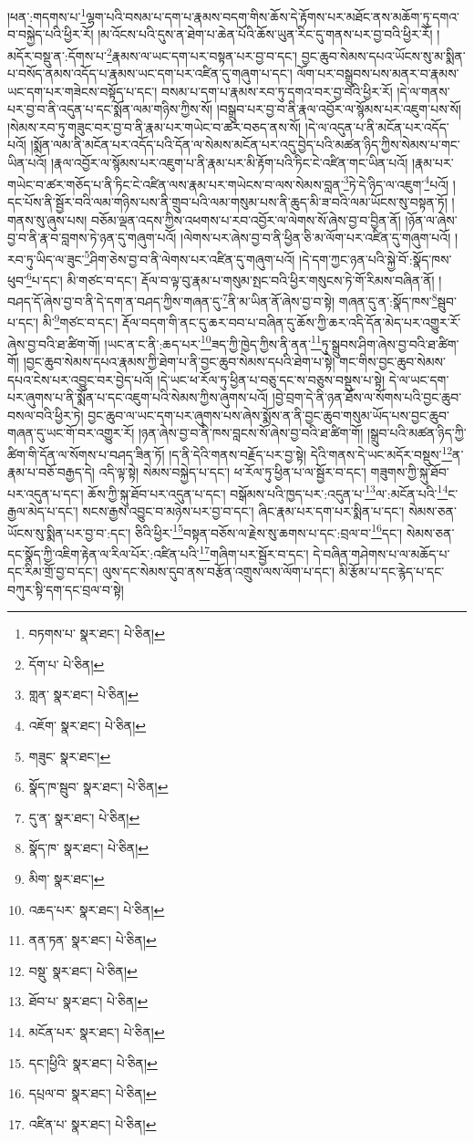 །ཕན་:གདགས་པ་\footnote{བཏགས་པ་  སྣར་ཐང་།  པེ་ཅིན། }ལྷག་པའི་བསམ་པ་དག་པ་རྣམས་བདག་གིས་ཆོས་དེ་རྟོགས་པར་མཐོང་ནས་མཆོག་ཏུ་དགའ་བ་བསྐྱེད་པའི་ཕྱིར་རོ། །མ་འོངས་པའི་དུས་ན་ཐེག་པ་ཆེན་པོའི་ཆོས་ཡུན་རིང་དུ་གནས་པར་བྱ་བའི་ཕྱིར་རོ། །
མདོར་བསྡུ་ན་:དོགས་པ་\footnote{དོག་པ་  པེ་ཅིན། }རྣམས་ལ་ཡང་དག་པར་བསྟན་པར་བྱ་བ་དང་། བྱང་ཆུབ་སེམས་དཔའ་ཡོངས་སུ་མ་སྨིན་པ་བསོད་ནམས་འདོད་པ་རྣམས་ཡང་དག་པར་འཛིན་དུ་གཞུག་པ་དང་། ལོག་པར་བསྒྲུབས་པས་མནར་བ་རྣམས་ཡང་དག་པར་གཟེངས་བསྟོད་པ་དང་། བསམ་པ་དག་པ་རྣམས་རབ་ཏུ་དགའ་བར་བྱ་བའི་ཕྱིར་རོ། །དེ་ལ་གནས་པར་བྱ་བ་ནི་འདུན་པ་དང་སྨོན་ལམ་གཉིས་ཀྱིས་སོ། །བསྒྲུབ་པར་བྱ་བ་ནི་རྣལ་འབྱོར་ལ་སྙོམས་པར་འཇུག་པས་སོ། །སེམས་རབ་ཏུ་གཟུང་བར་བྱ་བ་ནི་རྣམ་པར་གཡེང་བ་ཚར་བཅད་ནས་སོ། །དེ་ལ་འདུན་པ་ནི་མངོན་པར་འདོད་པའོ། །སྨོན་ལམ་ནི་མངོན་པར་འདོད་པའི་དོན་ལ་སེམས་མངོན་པར་འདུ་བྱེད་པའི་མཚན་ཉིད་ཀྱིས་སེམས་པ་གང་ཡིན་པའོ། །རྣལ་འབྱོར་ལ་སྙོམས་པར་འཇུག་པ་ནི་རྣམ་པར་མི་རྟོག་པའི་ཏིང་ངེ་འཛིན་གང་ཡིན་པའོ། །རྣམ་པར་གཡེང་བ་ཚར་གཅོད་པ་ནི་ཏིང་ངེ་འཛིན་ལས་རྣམ་པར་གཡེངས་བ་ལས་སེམས་བླན་\footnote{གླན་  སྣར་ཐང་།  པེ་ཅིན། }ཏེ་དེ་ཉིད་ལ་འཇུག་\footnote{འཇོག་  སྣར་ཐང་།  པེ་ཅིན། }པའོ། །དང་པོས་ནི་སྦྱོར་བའི་ལམ་གཉིས་པས་ནི་གྲུབ་པའི་ལམ་གསུམ་པས་ནི་ཆུད་མི་ཟ་བའི་ལམ་ཡོངས་སུ་བསྟན་ཏོ། །གནས་སུ་ཞུས་པས། བཅོམ་ལྡན་འདས་ཀྱིས་འཕགས་པ་རབ་འབྱོར་ལ་ལེགས་སོ་ཞེས་བྱ་བ་བྱིན་ནོ། །ཉོན་ལ་ཞེས་བྱ་བ་ནི་རྣ་བ་བླགས་ཏེ་ཉན་དུ་གཞུག་པའོ། །ལེགས་པར་ཞེས་བྱ་བ་ནི་ཕྱིན་ཅི་མ་ལོག་པར་འཛིན་དུ་གཞུག་པའོ། །རབ་ཏུ་ཡིད་ལ་ཟུང་\footnote{གཟུང་  སྣར་ཐང་། }ཤིག་ཅེས་བྱ་བ་ནི་ལེགས་པར་འཛིན་དུ་གཞུག་པའོ། །དེ་དག་ཀྱང་ཉན་པའི་སྐྱེ་བོ་:སྣོད་ཁས་ཕུབ་\footnote{སྣོད་ཁ་སྦུབ་  སྣར་ཐང་།  པེ་ཅིན། }པ་དང་། མི་གཙང་བ་དང་། རྡོལ་བ་ལྟ་བུ་རྣམ་པ་གསུམ་སྤང་བའི་ཕྱིར་གསུངས་ཏེ་གོ་རིམས་བཞིན་ནོ། །བཤད་དོ་ཞེས་བྱ་བ་ནི་དེ་དག་ན་བཤད་ཀྱིས་གཞན་དུ་\footnote{དུ་ན་  སྣར་ཐང་།  པེ་ཅིན། }ནི་མ་ཡིན་ནོ་ཞེས་བྱ་བ་སྟེ། གཞན་དུ་ན་:སྣོད་ཁས་\footnote{སྣོད་ཁ་  སྣར་ཐང་།  པེ་ཅིན། }སྦུབ་པ་དང་། མི་\footnote{མིག་  སྣར་ཐང་། }གཙང་བ་དང་། རྡོལ་བདག་གི་ནང་དུ་ཆར་བབ་པ་བཞིན་དུ་ཆོས་ཀྱི་ཆར་འདི་དོན་མེད་པར་འགྱུར་རོ་ཞེས་བྱ་བའི་ཐ་ཚིག་གོ། །ཡང་ན་ང་ནི་:ཆད་པར་\footnote{འཆད་པར་  སྣར་ཐང་།  པེ་ཅིན། }ཟད་ཀྱི་ཁྱེད་ཀྱིས་ནི་ནན་\footnote{ནན་ཏན་  སྣར་ཐང་།  པེ་ཅིན། }ཏུ་སྒྲུབས་ཤིག་ཞེས་བྱ་བའི་ཐ་ཚིག་གོ། །བྱང་ཆུབ་སེམས་དཔའ་རྣམས་ཀྱི་ཐེག་པ་ནི་བྱང་ཆུབ་སེམས་དཔའི་ཐེག་པ་སྟེ། གང་གིས་བྱང་ཆུབ་སེམས་དཔའ་ངེས་པར་འབྱུང་བར་བྱེད་པའོ། །དེ་ཡང་ཕ་རོལ་ཏུ་ཕྱིན་པ་བཅུ་དང་ས་བཅུས་བསྡུས་པ་སྟེ། དེ་ལ་ཡང་དག་པར་ཞུགས་པ་ནི་སྨོན་པ་དང་འཇུག་པའི་སེམས་ཀྱིས་ཞུགས་པའོ། །བྱེ་བྲག་དེ་ནི་ཉན་ཐོས་ལ་སོགས་པའི་བྱང་ཆུབ་བསལ་བའི་ཕྱིར་ཏེ། བྱང་ཆུབ་ལ་ཡང་དག་པར་ཞུགས་པས་ཞེས་སྨོས་ན་ནི་བྱང་ཆུབ་གསུམ་ཡོད་པས་བྱང་ཆུབ་གཞན་དུ་ཡང་གོ་བར་འགྱུར་རོ། །ཉན་ཞེས་བྱ་བ་ནི་ཁས་བླངས་སོ་ཞེས་བྱ་བའི་ཐ་ཚིག་གོ། །སྒྲུབ་པའི་མཚན་ཉིད་ཀྱི་ཚིག་གི་དོན་ལ་སོགས་པ་བཤད་ཟིན་ཏོ། །ད་ནི་དེའི་གནས་བརྗོད་པར་བྱ་སྟེ། དེའི་གནས་དེ་ཡང་མདོར་བསྡུས་\footnote{བསྡུ་  སྣར་ཐང་།  པེ་ཅིན། }ན་རྣམ་པ་བཅོ་བརྒྱད་དེ། འདི་ལྟ་སྟེ། སེམས་བསྐྱེད་པ་དང་། ཕ་རོལ་ཏུ་ཕྱིན་པ་ལ་སྦྱོར་བ་དང་། གཟུགས་ཀྱི་སྐུ་ཐོབ་པར་འདུན་པ་དང་། ཆོས་ཀྱི་སྐུ་ཐོབ་པར་འདུན་པ་དང་། བསྒོམས་པའི་ཁྱད་པར་:འདུན་པ་\footnote{ཐོབ་པ་  སྣར་ཐང་།  པེ་ཅིན། }ལ་:མངོན་པའི་\footnote{མངོན་པར་  སྣར་ཐང་།  པེ་ཅིན། }ང་རྒྱལ་མེད་པ་དང་། སངས་རྒྱས་འབྱུང་བ་མཉེས་པར་བྱ་བ་དང་། ཞིང་རྣམ་པར་དག་པར་སྨིན་པ་དང་། སེམས་ཅན་ཡོངས་སུ་སྨིན་པར་བྱ་བ་:དང་། ཅིའི་ཕྱིར་\footnote{དང་།ཕྱིའི་  སྣར་ཐང་།  པེ་ཅིན། }བསྟན་བཅོས་ལ་རྗེས་སུ་ཆགས་པ་དང་:བྲལ་བ་\footnote{དཔྲལ་བ་  སྣར་ཐང་།  པེ་ཅིན། }དང་། སེམས་ཅན་དང་སྣོད་ཀྱི་འཇིག་རྟེན་ལ་རིལ་པོར་:འཛིན་པའི་\footnote{འཛིན་པ་  སྣར་ཐང་།  པེ་ཅིན། }གཞིག་པར་སྦྱོར་བ་དང་། དེ་བཞིན་གཤེགས་པ་ལ་མཆོད་པ་དང་རིམ་གྲོ་བྱ་བ་དང་། ལུས་དང་སེམས་དུབ་ནས་བརྩོན་འགྲུས་ལས་ལོག་པ་དང་། མི་རྩོམ་པ་དང་རྙེད་པ་དང་བཀུར་སྟི་དག་དང་བྲལ་བ་སྟེ། 